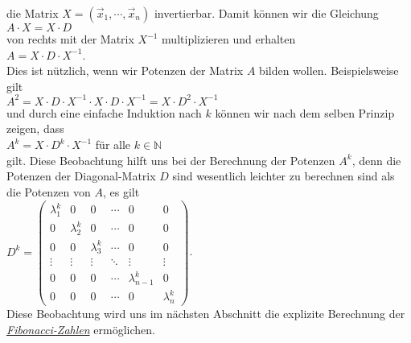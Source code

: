 die Matrix $X = (\vec{x}_1, \cdots, \vec{x}_n)$ invertierbar.  Damit k\"onnen wir die Gleichung
\\[0.2cm]
\hspace*{1.3cm}
$A \cdot X = X \cdot D$
\\[0.2cm]
von rechts mit der Matrix $X^{-1}$ multiplizieren und erhalten
\\[0.2cm]
\hspace*{1.3cm}
$A = X \cdot D \cdot X^{-1}$.
\\[0.2cm]
Dies ist n\"utzlich, wenn wir Potenzen der Matrix $A$ bilden wollen.  Beispielsweise gilt
\\[0.2cm]
\hspace*{1.3cm}
$A^2 = X \cdot D \cdot X^{-1} \cdot X \cdot D \cdot X^{-1} = X \cdot D^2 \cdot X^{-1}$
\\[0.2cm]
und durch eine einfache Induktion nach $k$ k\"onnen wir nach dem selben Prinzip zeigen, dass
\\[0.2cm]
\hspace*{1.3cm}
$A^k = X \cdot D^k \cdot X^{-1}$ \quad f\"ur alle $k \in \mathbb{N}$
\\[0.2cm]
gilt.  Diese Beobachtung hilft uns bei der Berechnung der Potenzen $A^k$, denn die Potenzen der
Diagonal-Matrix $D$ sind wesentlich  leichter zu berechnen sind als die Potenzen von $A$, es gilt
\\[0.2cm]
\hspace*{1.3cm}
$D^k = \left(
  \begin{array}{llllll}
    \lambda_1^k & 0         & 0         & \cdots & 0 & 0 \\ 
    0           & \lambda_2^k & 0         & \cdots & 0 & 0 \\
    0           & 0         & \lambda_3^k & \cdots & 0 & 0 \\
    \vdots      & \vdots    & \vdots    & \ddots & \vdots & \vdots \\
    0           & 0         & 0         & \cdots  & \lambda_{n-1}^k & 0 \\
    0           & 0         & 0         & \cdots & 0 & \lambda_n^k 
  \end{array}
\right)
$.
\\[0.2cm]
Diese Beobachtung wird uns im n\"achsten Abschnitt die explizite Berechnung der
\href{http://de.wikipedia.org/wiki/Fibonacci-Folge}{\emph{Fibonacci-Zahlen}} erm\"oglichen. 

